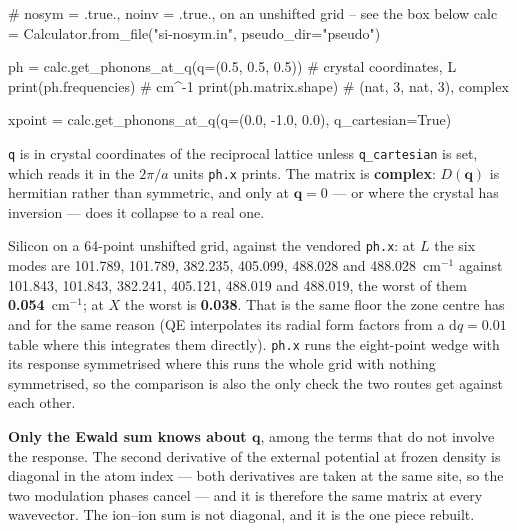 \documentclass[11pt,a4paper]{article}
\newcommand{\code}[1]{\texttt{\small #1}}
\begin{document}
\begin{pycode}
# nosym = .true., noinv = .true., on an unshifted grid -- see the box below
calc = Calculator.from_file("si-nosym.in", pseudo_dir="pseudo")

ph = calc.get_phonons_at_q(q=(0.5, 0.5, 0.5))          # crystal coordinates, L
print(ph.frequencies)                                   # cm^-1
print(ph.matrix.shape)                                  # (nat, 3, nat, 3), complex

xpoint = calc.get_phonons_at_q(q=(0.0, -1.0, 0.0), q_cartesian=True)
\end{pycode}

\noindent \code{q} is in crystal coordinates of the reciprocal lattice unless
\code{q\_cartesian} is set, which reads it in the $2\pi/a$ units \code{ph.x}
prints. The matrix is \textbf{complex}: $D(\mathbf q)$ is hermitian rather than
symmetric, and only at $\mathbf q = 0$ --- or where the crystal has inversion
--- does it collapse to a real one.

Silicon on a 64-point unshifted grid, against the vendored \code{ph.x}: at $L$
the six modes are 101.789, 101.789, 382.235, 405.099, 488.028 and
488.028~cm$^{-1}$ against 101.843, 101.843, 382.241, 405.121, 488.019 and
488.019, the worst of them \textbf{0.054}~cm$^{-1}$; at $X$ the worst is
\textbf{0.038}. That is the same floor the zone centre has and for the same
reason (QE interpolates its radial form factors from a $\mathrm{d}q = 0.01$
table where this integrates them directly). \code{ph.x} runs the eight-point
wedge with its response symmetrised where this runs the whole grid with nothing
symmetrised, so the comparison is also the only check the two routes get
against each other.

\textbf{Only the Ewald sum knows about $\mathbf q$}, among the terms that do not
involve the response. The second derivative of the external potential at frozen
density is diagonal in the atom index --- both derivatives are taken at the same
site, so the two modulation phases cancel --- and it is therefore the same
matrix at every wavevector. The ion--ion sum is not diagonal, and it is the one
piece rebuilt.
\end{document}
